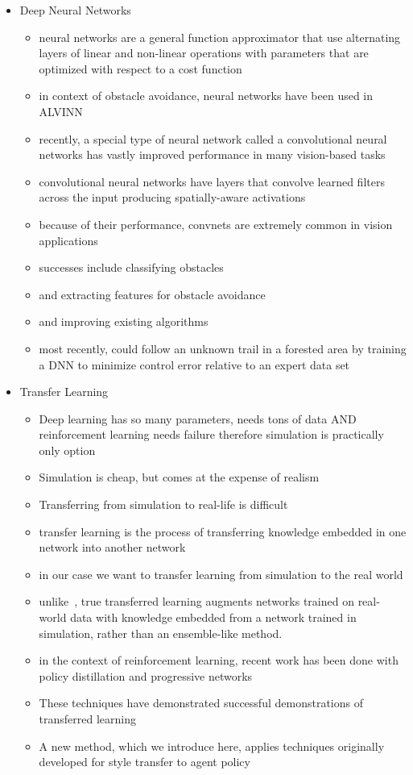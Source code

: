 \documentclass[paper=a4, fontsize=11pt]{scrartcl} %
\begin{document}
\begin{itemize}
\item Deep Neural Networks
	\begin{itemize}
		\item neural networks are a general function approximator that use alternating layers of linear and non-linear operations with parameters that are optimized with respect to a cost function
		\item in context of obstacle avoidance, neural networks have been used in ALVINN \cite{Pomerleau1989,Michels2005,riedmiller2009reinforcement}
		\item recently, a special type of neural network called a convolutional neural networks \cite{DBLP:journals/corr/SzegedyLJSRAEVR14} has vastly improved performance in many vision-based tasks
		\item convolutional neural networks have layers that convolve learned filters across the input producing spatially-aware activations
		\item because of their performance, convnets are extremely common in vision applications
		\item successes include classifying obstacles \cite{Hadsell2009} 
		\item and extracting features for obstacle avoidance
		\item and improving existing algorithms \cite{Kim2015}
		\item most recently, \cite{Guisti2016} could follow an unknown trail in a forested area by training a DNN to minimize control error relative to an expert data set
	\end{itemize}

\item Transfer Learning
	\begin{itemize}
		\item Deep learning has so many parameters, needs tons of data AND reinforcement learning needs failure therefore simulation is practically only option
		\item Simulation is cheap, but comes at the expense of realism
		\item Transferring from simulation to real-life is difficult
		\item transfer learning is the process of transferring knowledge embedded in one network into another network
		\item in our case we want to transfer learning from simulation to the real world
		\item unlike~\cite{Michels2005}, true transferred learning augments networks trained on real-world data with knowledge embedded from a network trained in simulation, rather than an ensemble-like method.
		\item in the context of reinforcement learning, recent work has been done with policy distillation \cite{Rusu2015} and progressive networks \cite{Rusu2016}
		\item These techniques have demonstrated successful demonstrations of transferred learning
		\item A new method, which we introduce here, applies techniques originally developed for style transfer to agent policy~\cite{Gatys2015}
	\end{itemize}


\end{itemize}
\end{document}
